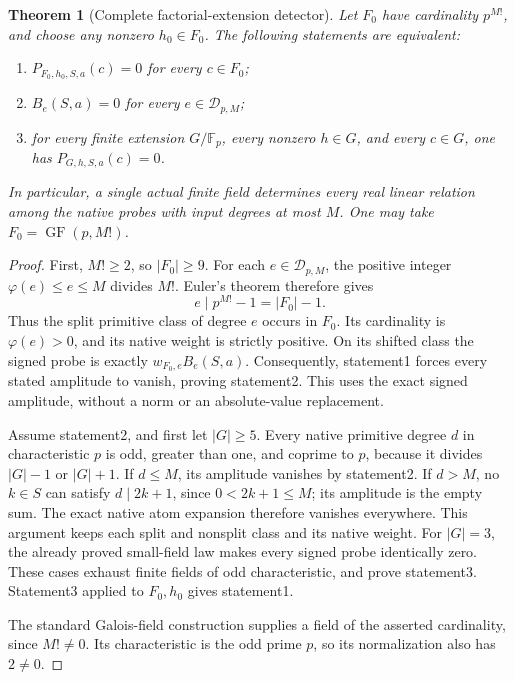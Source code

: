 \documentclass[11pt]{article}
\newtheorem{theorem}{Theorem}[section]
\begin{document}
\begin{theorem}[Complete factorial-extension detector]
\label{thm:odd-pell-finite-detector}
Let \(F_0\) have cardinality \(p^{M!}\), and choose any nonzero
\(h_0\in F_0\).  The following statements are equivalent:
\begin{enumerate}
 \item \(P_{F_0,h_0,S,a}(c)=0\) for every \(c\in F_0\);
 \item \(B_e(S,a)=0\) for every \(e\in\mathcal D_{p,M}\);
 \item for every finite extension \(G/\mathbb F_p\), every nonzero
 \(h\in G\), and every \(c\in G\), one has \(P_{G,h,S,a}(c)=0\).
\end{enumerate}
In particular, a single actual finite field determines every real linear
relation among the native probes with input degrees at most \(M\).
One may take \(F_0=\operatorname{GF}(p,M!)\).
\end{theorem}
\begin{proof}
First, \(M!\ge2\), so \(|F_0|\ge9\).
For each \(e\in\mathcal D_{p,M}\), the positive integer
\(\varphi(e)\le e\le M\) divides \(M!\).
Euler's theorem therefore gives
\[
 e\mid p^{M!}-1=|F_0|-1.
\]
Thus the split primitive class of degree \(e\) occurs in \(F_0\).
Its cardinality is \(\varphi(e)>0\), and its native weight is
strictly positive.  On its shifted class the signed probe is exactly
\(w_{F_0,e}B_e(S,a)\).
Consequently, statement1 forces every stated amplitude to vanish,
proving statement2.  This uses the exact signed amplitude, without
a norm or an absolute-value replacement.

Assume statement2, and first let \(|G|\ge5\).
Every native primitive degree \(d\) in characteristic \(p\) is odd,
greater than one, and coprime to \(p\), because it divides
\(|G|-1\) or \(|G|+1\).
If \(d\le M\), its amplitude vanishes by statement2.
If \(d>M\), no \(k\in S\) can satisfy \(d\mid2k+1\), since
\(0<2k+1\le M\); its amplitude is the empty sum.
The exact native atom expansion therefore vanishes everywhere.
This argument keeps each split and nonsplit class and its native weight.
For \(|G|=3\), the already proved small-field law makes every signed
probe identically zero.  These cases exhaust finite fields of odd
characteristic, and prove statement3.
Statement3 applied to \(F_0,h_0\) gives statement1.

The standard Galois-field construction supplies a field of the asserted
cardinality, since \(M!\ne0\).  Its characteristic is the odd prime \(p\),
so its normalization also has \(2\ne0\).
\end{proof}
\end{document}
